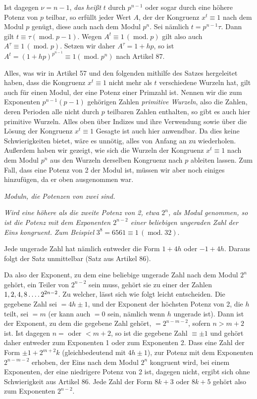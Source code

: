 Ist dagegen $\nu=n-1$, \emph{das heißt} $t$ durch $p^{n-1}$ oder sogar durch eine höhere Potenz von $p$ teilbar, so erfüllt jeder Wert $A$, der der Kongruenz $x^t\equiv1$ nach dem Modul $p$ genügt, diese auch nach dem Modul $p^n$. Sei nämlich $t=p^{n-1}\tau$. Dann gilt $t\equiv\tau(\operatorname{mod.}p-1)$. Wegen $A^t\equiv1\,(\operatorname{mod.}p)$ gilt also auch $A^{\tau}\equiv1\,(\operatorname{mod.}p)$. Setzen wir daher $A^{\tau}=1+hp$, so ist $A^t=(1+hp)^{p^{n-1}}\equiv1(\operatorname{mod.}p^n)$ nach Artikel 87.

Alles, was wir in Artikel 57 und den folgenden mithilfe des Satzes hergeleitet haben, dass die Kongruenz $x^t\equiv1$ nicht mehr als $t$ verschiedene Wurzeln hat, gilt auch für einen Modul, der eine Potenz einer Primzahl ist. Nennen wir die zum Exponenten $p^{n-1}(p-1)$ gehörigen Zahlen \emph{primitive Wurzeln}, also die Zahlen, deren Perioden alle nicht durch $p$ teilbaren Zahlen enthalten, so gibt es auch hier primitive Wurzeln. Alles oben über Indizes und ihre Verwendung sowie über die Lösung der Kongruenz $x^t\equiv1$ Gesagte ist auch hier anwendbar. Da dies keine Schwierigkeiten bietet, wäre es unnötig, alles von Anfang an zu wiederholen. Außerdem haben wir gezeigt, wie sich die Wurzeln der Kongruenz $x^t\equiv1$ nach dem Modul $p^n$ aus den Wurzeln derselben Kongruenz nach $p$ ableiten lassen. Zum Fall, dass eine Potenz von 2 der Modul ist, müssen wir aber noch einiges hinzufügen, da er oben ausgenommen war.

\begin{center}\emph{Moduln, die Potenzen von zwei sind.}\end{center}

\emph{Wird eine höhere als die zweite Potenz von 2, etwa $2^n$, als Modul genommen, so ist die Potenz mit dem Exponenten $2^{n-2}$ einer beliebigen ungeraden Zahl der Eins kongruent.}
\emph{Zum Beispiel} $3^8=6561\equiv1\,(\operatorname{mod.}32)$.

Jede ungerade Zahl hat nämlich entweder die Form $1+4h$ oder $-1+4h$. Daraus folgt der Satz unmittelbar (Satz aus Artikel 86).

Da also der Exponent, zu dem eine beliebige ungerade Zahl nach dem Modul $2^n$ gehört, ein Teiler von $2^{n-2}$ sein muss, gehört sie zu einer der Zahlen $1,2,4,8\mathinner{.\,.\,.\,.}2^{2n-2}$. Zu welcher, lässt sich wie folgt leicht entscheiden. Die gegebene Zahl sei $=4h\pm1$, und der Exponent der höchsten Potenz von 2, die $h$ teilt, sei $=m$ (er kann auch $=0$ sein, nämlich wenn $h$ ungerade ist). Dann ist der Exponent, zu dem die gegebene Zahl gehört, $=2^{n-m-2}$, sofern $n>m+2$ ist. Ist dagegen $n=$ oder $<m+2$, so ist die gegebene Zahl $\equiv\pm1$ und gehört daher entweder zum Exponenten 1 oder zum Exponenten 2. Dass eine Zahl der Form $\pm1+2^{m+2}k$ (gleichbedeutend mit $4h\pm1$), zur Potenz mit dem Exponenten $2^{n-m-2}$ erhoben, der Eins nach dem Modul $2^n$ kongruent wird, bei einem Exponenten, der eine niedrigere Potenz von 2 ist, dagegen nicht, ergibt sich ohne Schwierigkeit aus Artikel 86. Jede Zahl der Form $8k+3$ oder $8k+5$ gehört also zum Exponenten $2^{n-2}$.

